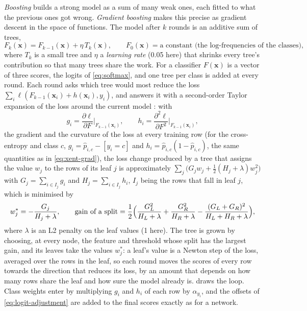 \emph{Boosting} builds a strong model as a sum of many weak ones, each fitted to what the
previous ones got wrong.  \emph{Gradient boosting} \cite{friedman2001gbm} makes this
precise as gradient descent in the space of functions.  The model after $k$ rounds is an
additive sum of trees,
\begin{equation}
  F_k(\mathbf{x}) = F_{k-1}(\mathbf{x}) + \eta\, T_k(\mathbf{x}), \qquad
  F_0(\mathbf{x}) = \text{a constant (the log-frequencies of the classes)},
  \label{eq:boosting}
\end{equation}
where $T_k$ is a small tree and $\eta$ a \emph{learning rate} (0.05 here) that shrinks
every tree's contribution so that many trees share the work.  For a classifier
$F(\mathbf{x})$ is a vector of three scores, the logits of \cref{eq:softmax}, and one tree
per class is added at every round.  Each round asks which tree would most reduce the loss
$\sum_i \ell(F_{k-1}(\mathbf{x}_i) + h(\mathbf{x}_i), y_i)$, and answers it with a
second-order Taylor expansion of the loss around the current model
\cite{chen2016xgboost}: with
\begin{equation}
  g_i = \frac{\partial \ell}{\partial F}\Big|_{F_{k-1}(\mathbf{x}_i)}, \qquad
  h_i = \frac{\partial^2 \ell}{\partial F^2}\Big|_{F_{k-1}(\mathbf{x}_i)},
\end{equation}
the gradient and the curvature of the loss at every training row (for the cross-entropy
and class $c$, $g_i = \hat{p}_{i,c} - [y_i = c]$ and $h_i = \hat{p}_{i,c}(1 -
\hat{p}_{i,c})$, the same quantities as in \cref{eq:xent-grad}), the loss change produced
by a tree that assigns the value $w_j$ to the rows of its leaf $j$ is approximately
$\sum_j \bigl( G_j w_j + \tfrac{1}{2} (H_j + \lambda) w_j^2 \bigr)$ with $G_j = \sum_{i \in
I_j} g_i$ and $H_j = \sum_{i \in I_j} h_i$, $I_j$ being the rows that fall in leaf $j$,
which is minimised by
\begin{equation}
  w_j^{\ast} = -\frac{G_j}{H_j + \lambda}, \qquad
  \text{gain of a split} = \frac{1}{2}\Bigl( \frac{G_L^2}{H_L + \lambda} + \frac{G_R^2}{H_R + \lambda} - \frac{(G_L + G_R)^2}{H_L + H_R + \lambda} \Bigr),
  \label{eq:leaf}
\end{equation}
where $\lambda$ is an L2 penalty on the leaf values (1 here).  The tree is grown by
choosing, at every node, the feature and threshold whose split has the largest gain, and
its leaves take the values $w_j^{\ast}$: a leaf's value is a Newton step of the loss,
averaged over the rows in the leaf, so each round moves the scores of every row towards
the direction that reduces its loss, by an amount that depends on how many rows share the
leaf and how sure the model already is.   draws the loop.  Class
weights enter by multiplying $g_i$ and $h_i$ of each row by $\alpha_{y_i}$, and the
offsets of \cref{eq:logit-adjustment} are added to the final scores exactly as for a
network.

